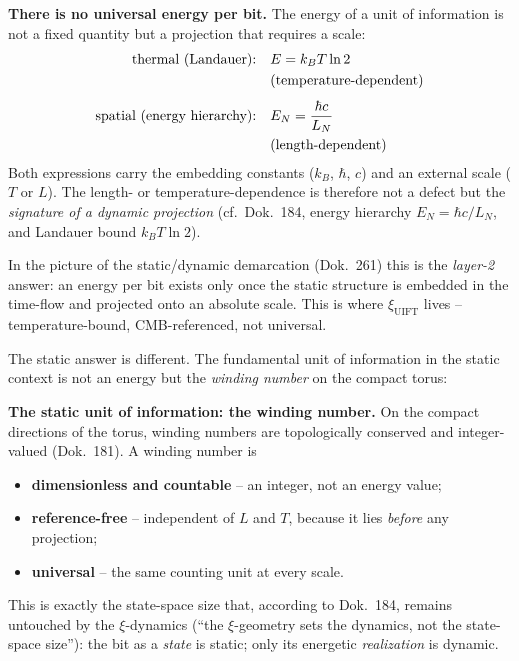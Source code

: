 	\begin{insight}
		\textbf{There is no universal energy per bit.}
		The energy of a unit of information is not a fixed quantity but a projection
		that requires a scale:
		\begin{align}
			\text{thermal (Landauer):}\quad & E = k_B T \ln 2 \notag \\
			& \text{(temperature-dependent)} \\[4pt]
			\text{spatial (energy hierarchy):}\quad & E_N = \frac{\hbar c}{L_N} \notag \\
			& \text{(length-dependent)}
		\end{align}
		Both expressions carry the embedding constants ($k_B$, $\hbar$, $c$) and an
		external scale ($T$ or $L$). The length- or temperature-dependence is therefore
		not a defect but the \emph{signature of a dynamic projection} (cf.\ Dok.~184,
		energy hierarchy $E_N = \hbar c / L_N$, and Landauer bound $k_B T \ln 2$).
	\end{insight}

	In the picture of the static/dynamic demarcation (Dok.~261) this is the
	\emph{layer-2} answer: an energy per bit exists only once the static structure is
	embedded in the time-flow and projected onto an absolute scale. This is where
	$\xi_{\text{UIFT}}$ lives -- temperature-bound, CMB-referenced, not universal.

	The static answer is different. The fundamental unit of information in the static
	context is not an energy but the \emph{winding number} on the compact torus:

	\begin{derivation}
		\textbf{The static unit of information: the winding number.}
		On the compact directions of the torus, winding numbers are topologically
		conserved and integer-valued (Dok.~181). A winding number is
		\begin{itemize}
			\item \textbf{dimensionless and countable} -- an integer, not an energy value;
			\item \textbf{reference-free} -- independent of $L$ and $T$, because it lies
			      \emph{before} any projection;
			\item \textbf{universal} -- the same counting unit at every scale.
		\end{itemize}
		This is exactly the state-space size that, according to Dok.~184, remains
		untouched by the $\xi$-dynamics (``the $\xi$-geometry sets the dynamics, not the
		state-space size''): the bit as a \emph{state} is static; only its energetic
		\emph{realization} is dynamic.
	\end{derivation}

